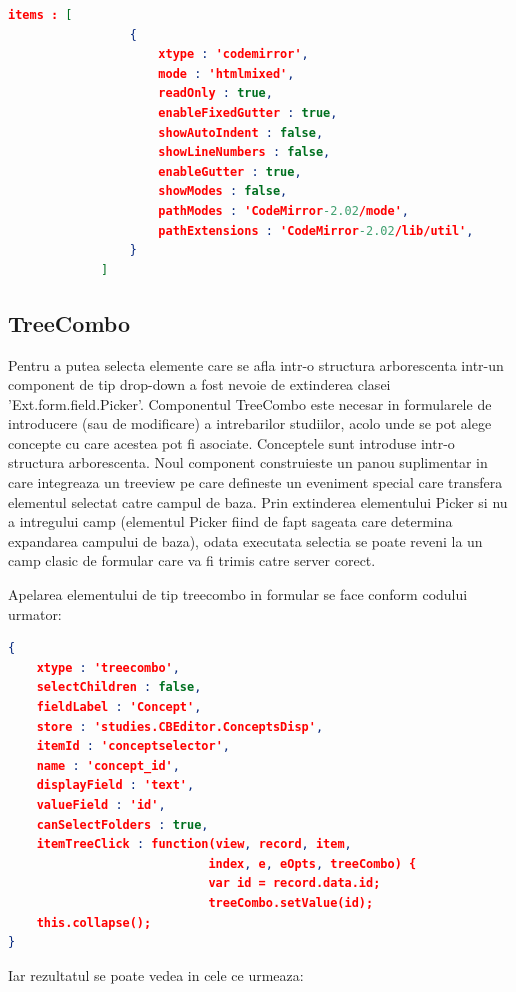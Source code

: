 \begin{lstlisting}[language=json,firstnumber=1]
    items : [
    	         {
        	         xtype : 'codemirror',
          			 mode : 'htmlmixed',
	                 readOnly : true,
	                 enableFixedGutter : true,
	                 showAutoIndent : false,
	                 showLineNumbers : false,
	                 enableGutter : true,
	                 showModes : false,
	                 pathModes : 'CodeMirror-2.02/mode',
	                 pathExtensions : 'CodeMirror-2.02/lib/util',
	             }
             ]
\end{lstlisting}


\subsection{TreeCombo}

Pentru a putea selecta elemente care se afla intr-o structura arborescenta intr-un component de tip drop-down a fost nevoie de extinderea clasei 'Ext.form.field.Picker'. Componentul TreeCombo este necesar in formularele de introducere (sau de modificare) a intrebarilor studiilor, acolo unde se pot alege concepte cu care acestea pot fi asociate. Conceptele sunt introduse intr-o structura arborescenta. Noul component construieste un panou suplimentar in care integreaza un treeview pe care defineste un eveniment special care transfera elementul selectat catre campul de baza. Prin extinderea elementului Picker si nu a intregului camp (elementul Picker fiind de fapt sageata care determina expandarea campului de baza), odata executata selectia se poate reveni la un camp clasic de formular care va fi trimis catre server corect. 

Apelarea elementului de tip treecombo in formular se face conform codului urmator:

\begin{lstlisting}[language=json,firstnumber=1]
{
	xtype : 'treecombo',
	selectChildren : false,
	fieldLabel : 'Concept',
	store : 'studies.CBEditor.ConceptsDisp',
	itemId : 'conceptselector',
	name : 'concept_id',
	displayField : 'text',
	valueField : 'id',
	canSelectFolders : true,
	itemTreeClick : function(view, record, item,
							index, e, eOpts, treeCombo) {
							var id = record.data.id;
							treeCombo.setValue(id);
	this.collapse();
}


\end{lstlisting}

Iar rezultatul se poate vedea in cele ce urmeaza:

